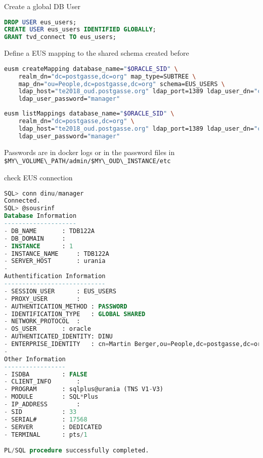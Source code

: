 \documentclass[a4paper,,tablecaptionabove]{scrartcl}
\newcommand{\passthrough}[1]{#1}
\begin{document}
Create a global DB User

\begin{lstlisting}[language=SQL]
DROP USER eus_users;
CREATE USER eus_users IDENTIFIED GLOBALLY;  
GRANT tvd_connect TO eus_users;  
\end{lstlisting}

Define a EUS mapping to the shared schema created before

\begin{lstlisting}[language=bash]
eusm createMapping database_name="$ORACLE_SID" \
    realm_dn="dc=postgasse,dc=org" map_type=SUBTREE \
    map_dn="ou=People,dc=postgasse,dc=org" schema=EUS_USERS \
    ldap_host="te2018_oud.postgasse.org" ldap_port=1389 ldap_user_dn="cn=eusadmin" \
    ldap_user_password="manager"  
\end{lstlisting}

\begin{lstlisting}[language=bash]
eusm listMappings database_name="$ORACLE_SID" \
    realm_dn="dc=postgasse,dc=org" \
    ldap_host="te2018_oud.postgasse.org" ldap_port=1389 ldap_user_dn="cn=eusadmin" \
    ldap_user_password="manager"
\end{lstlisting}

Passwords are in docker logs or in the password files in
\passthrough{\lstinline!$MY\_VOLUME\_PATH/admin/$MY\_OUD\_INSTANCE/etc!}

check EUS connection

\begin{lstlisting}[language=SQL]
SQL> conn dinu/manager
Connected.
SQL> @sousrinf
Database Information
--------------------
- DB_NAME       : TDB122A
- DB_DOMAIN     :
- INSTANCE      : 1
- INSTANCE_NAME     : TDB122A
- SERVER_HOST       : urania
-
Authentification Information
----------------------------
- SESSION_USER      : EUS_USERS
- PROXY_USER        :
- AUTHENTICATION_METHOD : PASSWORD
- IDENTIFICATION_TYPE   : GLOBAL SHARED
- NETWORK_PROTOCOL  :
- OS_USER       : oracle
- AUTHENTICATED_IDENTITY: DINU
- ENTERPRISE_IDENTITY   : cn=Martin Berger,ou=People,dc=postgasse,dc=org
-
Other Information
-----------------
- ISDBA         : FALSE
- CLIENT_INFO       :
- PROGRAM       : sqlplus@urania (TNS V1-V3)
- MODULE        : SQL*Plus
- IP_ADDRESS        :
- SID           : 33
- SERIAL#       : 17568
- SERVER        : DEDICATED
- TERMINAL      : pts/1

PL/SQL procedure successfully completed.
\end{lstlisting}
\end{document}
